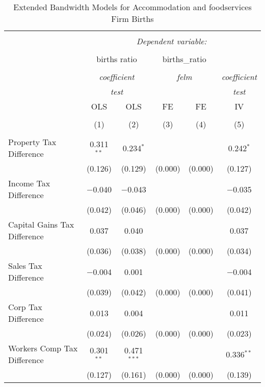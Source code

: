 
\begin{table}[!htbp] \centering 
  \caption{Extended Bandwidth Models for  Accommodation and foodservices Firm Births} 
  \label{} 
\begin{tabular}{@{\extracolsep{5pt}}lccccc} 
\\[-1.8ex]\hline 
\hline \\[-1.8ex] 
 & \multicolumn{5}{c}{\textit{Dependent variable:}} \\ 
\cline{2-6} 
\\[-1.8ex] & \multicolumn{2}{c}{births ratio} & \multicolumn{2}{c}{births\_ratio} &   \\ 
\\[-1.8ex] & \multicolumn{2}{c}{\textit{coefficient}} & \multicolumn{2}{c}{\textit{felm}} & \textit{coefficient} \\ 
 & \multicolumn{2}{c}{\textit{test}} & \multicolumn{2}{c}{\textit{}} & \textit{test} \\ 
 & OLS & OLS & FE & FE & IV \\ 
\\[-1.8ex] & (1) & (2) & (3) & (4) & (5)\\ 
\hline \\[-1.8ex] 
 Property Tax Difference & 0.311$^{**}$ & 0.234$^{*}$ &  &  & 0.242$^{*}$ \\ 
  & (0.126) & (0.129) & (0.000) & (0.000) & (0.127) \\ 
  Income Tax Difference & $-$0.040 & $-$0.043 &  &  & $-$0.035 \\ 
  & (0.042) & (0.046) & (0.000) & (0.000) & (0.042) \\ 
  Capital Gains Tax Difference & 0.037 & 0.040 &  &  & 0.037 \\ 
  & (0.036) & (0.038) & (0.000) & (0.000) & (0.034) \\ 
  Sales Tax Difference & $-$0.004 & 0.001 &  &  & $-$0.004 \\ 
  & (0.039) & (0.042) & (0.000) & (0.000) & (0.041) \\ 
  Corp Tax Difference & 0.013 & 0.004 &  &  & 0.011 \\ 
  & (0.024) & (0.026) & (0.000) & (0.000) & (0.023) \\ 
  Workers Comp Tax Difference & 0.301$^{**}$ & 0.471$^{***}$ &  &  & 0.336$^{**}$ \\ 
  & (0.127) & (0.161) & (0.000) & (0.000) & (0.139) \\ 

\end{tabular}
\end{table}
